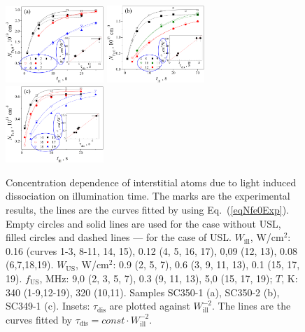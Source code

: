 \documentclass[%
 aip,jap,
 amsmath,amssymb,
 reprint,%
]{revtex4-1}
\begin{document}
\begin{figure}
\includegraphics[width=0.33\textwidth]{Fig4a}%
\includegraphics[width=0.33\textwidth]{Fig4b}%
\includegraphics[width=0.33\textwidth]{Fig4c}%
\caption{\label{Fig:Nfe_till}
Concentration dependence of interstitial atoms due to light induced dissociation on illumination time.
The marks are the experimental results, the lines are the curves  fitted by using Eq.~(\ref{eqNfe0Exp}).
Empty circles and solid lines are used for  the case without USL,
filled circles and dashed lines --- for the case of USL.
$W_\mathrm{ill}$, W/cm$^2$: 0.16 (curves 1-3, 8-11, 14, 15),
0.12 (4, 5, 16, 17), 0,09 (12, 13), 0.08 (6,7,18,19).
$W_\mathrm{US}$, W/cm$^2$:
0.9 (2, 5, 7), 0.6 (3, 9, 11, 13), 0.1 (15, 17, 19).
$f_\mathrm{US}$, MHz:
9,0 (2, 3, 5, 7), 0.3 (9, 11, 13), 5,0 (15, 17, 19);
$T$, K:
340 (1-9,12-19), 320 (10,11).
Samples SC350-1 (a), SC350-2 (b), SC349-1 (c).
Insets: $\tau_\mathrm{dis}$ are plotted against $W_\mathrm{ill}^{-2}$.
The lines are the curves fitted by $\tau_\mathrm{dis}=const\cdot W_\mathrm{ill}^{-2}$.
}
\end{figure}
\end{document}
